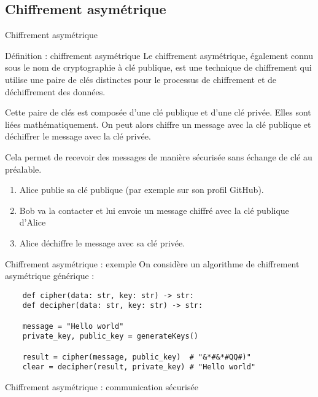 \subsection{Chiffrement asymétrique}

\begin{frame}{Chiffrement asymétrique}
  \begin{block}{Définition : chiffrement asymétrique}
    Le chiffrement asymétrique, également connu sous le nom de cryptographie à clé publique, est une technique de chiffrement qui utilise une paire de clés distinctes pour le processus de chiffrement et de déchiffrement des données.

    Cette paire de clés est composée d'une clé publique et d'une clé privée. Elles sont liées mathématiquement. On peut alors chiffre un message avec la clé publique et déchiffrer le message avec la clé privée.
  \end{block}

  Cela permet de recevoir des messages de manière sécurisée sans échange de clé au préalable.

  \begin{enumerate}
    \item Alice publie sa clé publique (par exemple sur son profil GitHub).
    \item Bob va la contacter et lui envoie un message chiffré avec la clé publique d'Alice
    \item Alice déchiffre le message avec sa clé privée.
  \end{enumerate}
\end{frame}

\begin{frame}[fragile]{Chiffrement asymétrique : exemple}
  On considère un algorithme de chiffrement asymétrique générique :

  \begin{verbatim}
    def cipher(data: str, key: str) -> str:
    def decipher(data: str, key: str) -> str:

    message = "Hello world"
    private_key, public_key = generateKeys()

    result = cipher(message, public_key)  # "&*#&*#QQ#)"
    clear = decipher(result, private_key) # "Hello world"
  \end{verbatim}
\end{frame}

\begin{frame}{Chiffrement asymétrique : communication sécurisée}
  
\end{frame}


